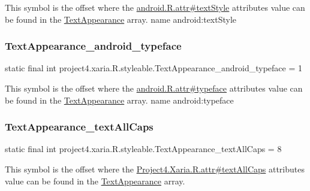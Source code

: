 This symbol is the offset where the \hyperlink{}{android.\+R.\+attr\#text\+Style} attribute\textquotesingle{}s value can be found in the \hyperlink{classproject4_1_1xaria_1_1R_1_1styleable_a324a4bda63d9f00d154e0a6c1eb718b0}{Text\+Appearance} array.  name android\+:text\+Style \mbox{\label{classproject4_1_1xaria_1_1R_1_1styleable_a5f9cfadc1fc87f837610aa77360f6e3a}} 
\subsubsection{\texorpdfstring{Text\+Appearance\+\_\+android\+\_\+typeface}{TextAppearance\_android\_typeface}}
{\footnotesize\ttfamily static final int project4.\+xaria.\+R.\+styleable.\+Text\+Appearance\+\_\+android\+\_\+typeface = 1\hspace{0.3cm}{\ttfamily [static]}}

This symbol is the offset where the \hyperlink{}{android.\+R.\+attr\#typeface} attribute\textquotesingle{}s value can be found in the \hyperlink{classproject4_1_1xaria_1_1R_1_1styleable_a324a4bda63d9f00d154e0a6c1eb718b0}{Text\+Appearance} array.  name android\+:typeface \mbox{\label{classproject4_1_1xaria_1_1R_1_1styleable_ab717490758690b0582f6ffbc6ce728f4}} 
\subsubsection{\texorpdfstring{Text\+Appearance\+\_\+text\+All\+Caps}{TextAppearance\_textAllCaps}}
{\footnotesize\ttfamily static final int project4.\+xaria.\+R.\+styleable.\+Text\+Appearance\+\_\+text\+All\+Caps = 8\hspace{0.3cm}{\ttfamily [static]}}

This symbol is the offset where the \hyperlink{}{Project4.\+Xaria.\+R.\+attr\#text\+All\+Caps} attribute\textquotesingle{}s value can be found in the \hyperlink{classproject4_1_1xaria_1_1R_1_1styleable_a324a4bda63d9f00d154e0a6c1eb718b0}{Text\+Appearance} array.

